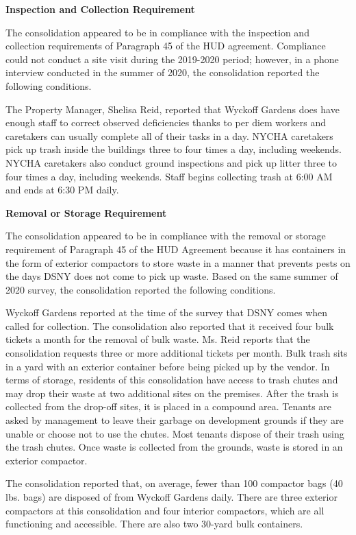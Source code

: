 

\textbf{Inspection and Collection Requirement}

The consolidation appeared to be in compliance with the inspection and collection requirements of Paragraph 45 of the HUD agreement. Compliance could not conduct a site visit during the 2019-2020 period; however, in a phone interview conducted in the summer of 2020, the consolidation reported the following conditions.

The Property Manager, Shelisa Reid, reported that Wyckoff Gardens does have enough staff to correct observed deficiencies thanks to per diem workers and caretakers can usually complete all of their tasks in a day. NYCHA caretakers pick up trash inside the buildings three to four times a day, including weekends. NYCHA caretakers also conduct ground inspections and pick up litter three to four times a day, including weekends. Staff begins collecting trash at 6:00 AM and ends at 6:30 PM daily. 

\textbf{Removal or Storage Requirement}

The consolidation appeared to be in compliance with the  removal or storage requirement of Paragraph  45 of the HUD Agreement because it has containers in the form of exterior compactors to store waste in a manner that prevents pests on the days DSNY does not come to pick up waste. Based on the same summer of  2020 survey, the consolidation reported the following conditions.

Wyckoff Gardens reported at the time of the survey that DSNY comes when called for collection. The consolidation also reported that it received four bulk tickets a month for the removal of bulk waste. Ms. Reid reports that the consolidation requests three or more additional tickets per month.  Bulk trash sits in a yard with an exterior container before being picked up by the vendor. In terms of storage, residents of this consolidation have access to trash chutes and may drop their waste at two additional sites on the premises. After the trash is collected from the drop-off sites, it is placed in a compound area. Tenants are  asked by management to leave their garbage on development grounds if they are unable or choose not to use the chutes. Most tenants dispose of their trash using the trash chutes. Once waste is collected from the grounds, waste is stored in an exterior compactor. 

The consolidation reported that, on average, fewer than 100 compactor bags (40 lbs. bags)  are disposed of from Wyckoff Gardens daily. There are three exterior compactors at this consolidation and four interior compactors, which are all functioning and accessible. There are also two 30-yard bulk containers.

